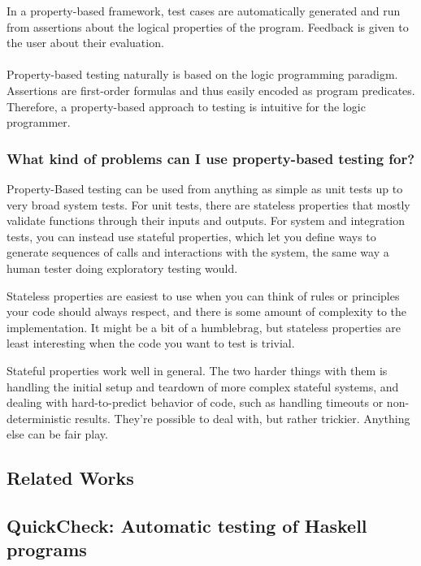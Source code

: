 \documentclass{report}
\begin{document}
In a property-based framework, test cases are automatically generated and run from assertions about the logical properties of the program. Feedback is given to the user about their evaluation.\\\\
Property-based testing naturally is based on the logic programming paradigm. Assertions are first-order formulas and thus easily encoded as program predicates. Therefore, a property-based approach to testing is intuitive for the logic programmer.

\subsubsection*{What kind of problems can I use property-based testing for?}

Property-Based testing can be used from anything as simple as unit tests up to very broad system tests. For unit tests, there are stateless properties that mostly validate functions through their inputs and outputs. For system and integration tests, you can instead use stateful properties, which let you define ways to generate sequences of calls and interactions with the system, the same way a human tester doing exploratory testing would.

Stateless properties are easiest to use when you can think of rules or principles your code should always respect, and there is some amount of complexity to the implementation. It might be a bit of a humblebrag, but stateless properties are least interesting when the code you want to test is trivial.

Stateful properties work well in general. The two harder things with them is handling the initial setup and teardown of more complex stateful systems, and dealing with hard-to-predict behavior of code, such as handling timeouts or non-deterministic results. They’re possible to deal with, but rather trickier. Anything else can be fair play.

\subsection*{Related Works}

\subsection{QuickCheck: Automatic testing of Haskell programs}
\end{document}
